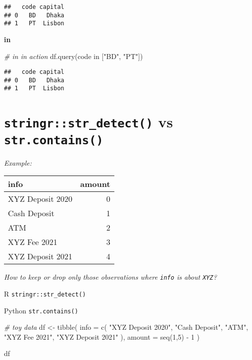 \documentclass[
]{book}
\newenvironment{Shaded}{\begin{snugshade}}{\end{snugshade}}
\newcommand{\AttributeTok}[1]{\textcolor[rgb]{0.77,0.63,0.00}{#1}}
\newcommand{\CommentTok}[1]{\textcolor[rgb]{0.56,0.35,0.01}{\textit{#1}}}
\newcommand{\DecValTok}[1]{\textcolor[rgb]{0.00,0.00,0.81}{#1}}
\newcommand{\FunctionTok}[1]{\textcolor[rgb]{0.00,0.00,0.00}{#1}}
\newcommand{\NormalTok}[1]{#1}
\newcommand{\OtherTok}[1]{\textcolor[rgb]{0.56,0.35,0.01}{#1}}
\newcommand{\SpecialCharTok}[1]{\textcolor[rgb]{0.00,0.00,0.00}{#1}}
\newcommand{\StringTok}[1]{\textcolor[rgb]{0.31,0.60,0.02}{#1}}
\begin{document}
\begin{verbatim}
##   code capital
## 0   BD   Dhaka
## 1   PT  Lisbon
\end{verbatim}

\textbf{in}

\begin{Shaded}
\begin{Highlighting}[]
\CommentTok{\# in in action}
\NormalTok{df.query(}\StringTok{\textquotesingle{}code in ["BD", "PT"]\textquotesingle{}}\NormalTok{)}
\end{Highlighting}
\end{Shaded}

\begin{verbatim}
##   code capital
## 0   BD   Dhaka
## 1   PT  Lisbon
\end{verbatim}

\hypertarget{stringrstr_detect-vs-str.contains}{%
\section{\texorpdfstring{\texttt{stringr::str\_detect()} vs \texttt{str.contains()}}{stringr::str\_detect() vs str.contains()}}\label{stringrstr_detect-vs-str.contains}}

\emph{Example:}

\begin{longtable}[]{@{}lr@{}}
\toprule
info & amount \\
\midrule
\endhead
XYZ Deposit 2020 & 0 \\
Cash Deposit & 1 \\
ATM & 2 \\
XYZ Fee 2021 & 3 \\
XYZ Deposit 2021 & 4 \\
\bottomrule
\end{longtable}

\emph{How to keep or drop only those observations where \texttt{info} is about \texttt{XYZ}? }

R \texttt{stringr::str\_detect()}

Python \texttt{str.contains()}

\begin{Shaded}
\begin{Highlighting}[]
\CommentTok{\# toy data}
\NormalTok{df }\OtherTok{\textless{}{-}} \FunctionTok{tibble}\NormalTok{(}
  \AttributeTok{info =} \FunctionTok{c}\NormalTok{(}
    \StringTok{"XYZ Deposit 2020"}\NormalTok{,}
    \StringTok{"Cash Deposit"}\NormalTok{,}
    \StringTok{"ATM"}\NormalTok{,}
    \StringTok{"XYZ Fee 2021"}\NormalTok{,}
    \StringTok{"XYZ Deposit 2021"}
\NormalTok{  ),}
  \AttributeTok{amount =} \FunctionTok{seq}\NormalTok{(}\DecValTok{1}\NormalTok{,}\DecValTok{5}\NormalTok{) }\SpecialCharTok{{-}} \DecValTok{1}
\NormalTok{)}

\NormalTok{df}
\end{Highlighting}
\end{Shaded}
\end{document}
